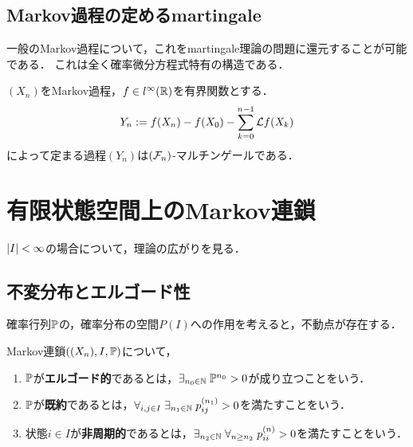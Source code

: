 \documentclass[uplatex,dvipdfmx]{jsreport}
\begin{document}
\subsection{Markov過程の定めるmartingale}

\begin{tcolorbox}[colframe=ForestGreen, colback=ForestGreen!10!white,breakable,colbacktitle=ForestGreen!40!white,coltitle=black,fonttitle=\bfseries\sffamily,
title=]
    一般のMarkov過程について，これをmartingale理論の問題に還元することが可能である．
    これは全く確率微分方程式特有の構造である．
\end{tcolorbox}

\begin{theorem}
    $(X_n)$をMarkov過程，$f\in l^\infty(\mathbb{R})$を有界関数とする．
    \[Y_n:=f(X_n)-f(X_0)-\sum_{k=0}^{n-1}\mathcal{L} f(X_k)\]
    によって定まる過程$(Y_n)$は$(\mathcal{F}_n)$-マルチンゲールである．
\end{theorem}

\section{有限状態空間上のMarkov連鎖}

\begin{tcolorbox}[colframe=ForestGreen, colback=ForestGreen!10!white,breakable,colbacktitle=ForestGreen!40!white,coltitle=black,fonttitle=\bfseries\sffamily,
title=]
    $\lvert I\rvert<\infty$の場合について，理論の広がりを見る．
\end{tcolorbox}

\subsection{不変分布とエルゴード性}

\begin{tcolorbox}[colframe=ForestGreen, colback=ForestGreen!10!white,breakable,colbacktitle=ForestGreen!40!white,coltitle=black,fonttitle=\bfseries\sffamily,
title=]
    確率行列$\mathbb{P}$の，確率分布の空間$P(I)$への作用を考えると，不動点が存在する．
\end{tcolorbox}

\begin{definition}
    Markov連鎖$((X_n),I,\mathbb{P})$について，
    \begin{enumerate}
        \item $\mathbb{P}$が\textbf{エルゴード的}であるとは，$\exists_{n_0\in\mathbb{N}}\;\mathbb{P}^{n_0}>0$が成り立つことをいう．
        \item $\mathbb{P}$が\textbf{既約}であるとは，$\forall_{i,j\in I}\;\exists_{n_1\in\mathbb{N}}\;p_{ij}^{(n_1)}>0$を満たすことをいう．
        \item 状態$i\in I$が\textbf{非周期的}であるとは，$\exists_{n_2\in\mathbb{N}}\;\forall_{n\ge n_2}\;p_{ii}^{(n)}>0$を満たすことをいう．
    \end{enumerate}
\end{definition}
\end{document}
